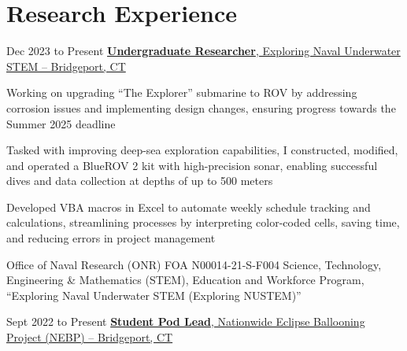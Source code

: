\section{Research Experience}
    \begin{twocolentry}{
        Dec 2023 to Present
    }
        \href{https://nustem.bridgeport.edu/}{\textbf{Undergraduate Researcher}, Exploring Naval Underwater STEM -- Bridgeport, CT}
    \end{twocolentry}

    \vspace{0.10 cm}
    \begin{onecolentry}
        \begin{highlights}
            \item Working on upgrading “The Explorer” submarine to ROV by addressing corrosion issues and implementing design changes, ensuring progress towards the Summer 2025 deadline
            \item Tasked with improving deep-sea exploration capabilities, I constructed, modified, and operated a BlueROV 2 kit with high-precision sonar, enabling successful dives and data collection at depths of up to 500 meters
            \item Developed VBA macros in Excel to automate weekly schedule tracking and calculations, streamlining processes by interpreting color-coded cells, saving time, and reducing errors in project management
            \item Office of Naval Research (ONR) FOA N00014-21-S-F004 Science, Technology, Engineering \& Mathematics (STEM), Education and Workforce Program, “Exploring Naval Underwater STEM (Exploring NUSTEM)”
        \end{highlights}
    \end{onecolentry}

    \vspace{0.2 cm}

    \begin{twocolentry}{
        Sept 2022 to Present
    }
        \href{http://eclipse.montana.edu/}{\textbf{Student Pod Lead}, Nationwide Eclipse Ballooning Project (NEBP) -- Bridgeport, CT}
    \end{twocolentry}

